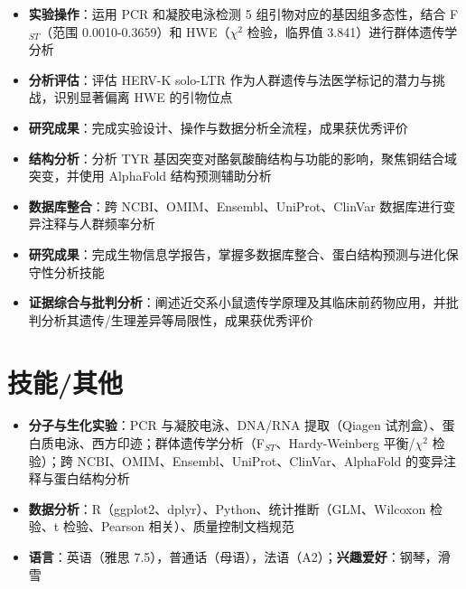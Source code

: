 \documentclass{my-resume}
\begin{document}
\begin{itemize}[parsep=0.2ex]
  \item \textbf{实验操作}：运用 PCR 和凝胶电泳检测 5 组引物对应的基因组多态性，结合 F$_{ST}$（范围 0.0010-0.3659）和 HWE（$\chi^2$ 检验，临界值 3.841）进行群体遗传学分析
  \item \textbf{分析评估}：评估 HERV-K solo-LTR 作为人群遗传与法医学标记的潜力与挑战，识别显著偏离 HWE 的引物位点
  \item \textbf{研究成果}：完成实验设计、操作与数据分析全流程，成果获优秀评价
\end{itemize}

\begin{itemize}[parsep=0.2ex]
  \item \textbf{结构分析}：分析 TYR 基因突变对酪氨酸酶结构与功能的影响，聚焦铜结合域突变，并使用 AlphaFold 结构预测辅助分析
  \item \textbf{数据库整合}：跨 NCBI、OMIM、Ensembl、UniProt、ClinVar 数据库进行变异注释与人群频率分析
  \item \textbf{研究成果}：完成生物信息学报告，掌握多数据库整合、蛋白结构预测与进化保守性分析技能
\end{itemize}

\begin{itemize}[parsep=0.2ex]
  \item \textbf{证据综合与批判分析}：阐述近交系小鼠遗传学原理及其临床前药物应用，并批判分析其遗传/生理差异等局限性，成果获优秀评价
\end{itemize}

\section{技能/其他}
\entrySkillsSep
\begin{itemize}[parsep=0.2ex]
  \item \textbf{分子与生化实验}：PCR 与凝胶电泳、DNA/RNA 提取（Qiagen 试剂盒）、蛋白质电泳、西方印迹；群体遗传学分析（F$_{ST}$、Hardy-Weinberg 平衡/$\chi^2$ 检验）；跨 NCBI、OMIM、Ensembl、UniProt、ClinVar、AlphaFold 的变异注释与蛋白结构分析
  \item \textbf{数据分析}：R（ggplot2、dplyr）、Python、统计推断（GLM、Wilcoxon 检验、t 检验、Pearson 相关）、质量控制文档规范
  \item \textbf{语言}：英语（雅思 7.5），普通话（母语），法语（A2）；\textbf{兴趣爱好}：钢琴，滑雪
\end{itemize}
\end{document}
